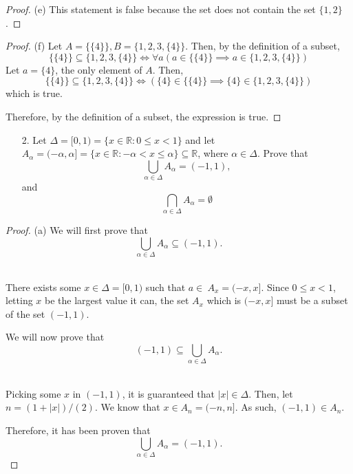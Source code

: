 \documentclass[10pt]{article}
\theoremstyle{definition}
\theoremstyle{plain}
\newcommand{\R}{\mathbb{R}}
\begin{document}
\begin{proof}{(e)}
  This statement is false because the set does not contain the set $\{1,2\}$.
\end{proof}

\begin{proof}{(f)}
  Let $A=\{\{4\}\}, B = \{1,2,3,\{4\}\}$. Then, by the definition of a subset,
  \begin{equation*}
    \{\{4\}\} \subseteq \{1,2,3,\{4\}\} \iff \forall a(a\in \{\{4\}\} \implies a\in \{1,2,3,\{4\}\})
  \end{equation*}
  Let $a=\{4\}$, the only element of $A$. Then,
  \begin{equation*}
      \{\{4\}\} \subseteq \{1,2,3,\{4\}\} \iff (\{4\}\in \{\{4\}\} \implies \{4\}\in \{1,2,3,\{4\}\})
  \end{equation*}
  which is true. \\

  \par Therefore, by the definition of a subset, the expression is true.
\end{proof}



\pagebreak



\begin{enumerate}
  \item[2.] Let $\Delta = [0,1) = \{x \in \R: 0 \leq x < 1\}$ and let $A_\alpha = (-\alpha,\alpha] = \{x \in \R: -\alpha < x \leq \alpha\} \subseteq \R$, where $\alpha \in \Delta$.  Prove that
      $$\bigcup_{\alpha \in \Delta} A_\alpha = (-1,1),$$
   and
      $$\bigcap_{\alpha \in \Delta} A_\alpha = \emptyset$$
\end{enumerate}

\begin{proof}{(a)}
  We will first prove that $$\bigcup_{\alpha \in \Delta} A_\alpha \subseteq (-1,1).$$ \\

  \par There exists some $x\in\Delta = [0,1)$ such that $a\in\ A_x=(-x,x]$. Since $0 \leq x<1$, letting $x$ be the largest value it can, the set $A_x$ which is $(-x,x]$ must be a subset of the set $(-1,1)$. \\

  \par We will now prove that $$(-1,1) \subseteq \bigcup_{\alpha \in \Delta} A_\alpha.$$ \\

  \par Picking some $x$ in $(-1,1)$, it is guaranteed that $|x|\in\Delta$. Then, let $n=(1+|x|)/(2)$. We know that $x\in A_n = (-n, n]$. As such, $(-1,1)\in A_n$. \\

  \par Therefore, it has been proven that $$\bigcup_{\alpha \in \Delta} A_\alpha = (-1,1).$$
\end{proof}
\end{document}
